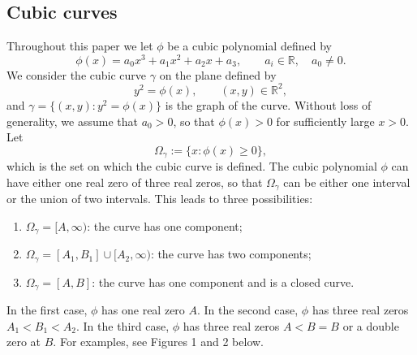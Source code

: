 \documentclass{amsart}
\theoremstyle{remark}
\def\g{{\gamma}}
\def\RR{{\mathbb R}}
\begin{document}
\subsection{Cubic curves}\label{sect:cubiccurves}
Throughout this paper we let $\phi$ be a cubic polynomial defined by 
\begin{equation}\label{eq:cubic-curve}
  \phi(x) = a_0 x^3 + a_1 x^2 + a_2 x + a_3, \qquad a_i \in \RR, \quad a_0 \ne 0.
\end{equation}
We consider the cubic curve $\g$ on the plane defined by 
$$
    y^2 = \phi(x), \qquad (x,y) \in \RR^2,  
$$
and $\g = \{(x,y): y^2 = \phi(x)\}$ is the graph of the curve. Without loss of generality, we assume that 
$a_0>0$, so that $\phi(x) > 0$ for sufficiently large $x > 0$. Let 
$$
   \Omega_\g:= \{x: \phi(x) \ge 0\},
$$
which is the set on which the cubic curve is defined. The cubic polynomial $\phi$ can have either one 
real zero of three real zeros, so that $\Omega_\g$ can be either one interval or the union of two
intervals. This leads to three possibilities: 
\begin{enumerate}[    (I)]
\item $\Omega_\g = [A,\infty)$: the curve has one component; 
\item $\Omega_\g = [A_1, B_1] \cup [A_2, \infty)$: the curve has two components; 
\item $\Omega_\g = [A,B]$: the curve has one component and is a closed curve.
\end{enumerate}
In the first case, $\phi$ has one real zero $A$. In the second case, $\phi$ has three real
zeros $A_1 < B_1 < A_2$. In the third case, $\phi$ has three real zeros $A < B = B$ or a
double zero at $B$. 
For examples, see Figures 1 and 2 below. 
\end{document}

